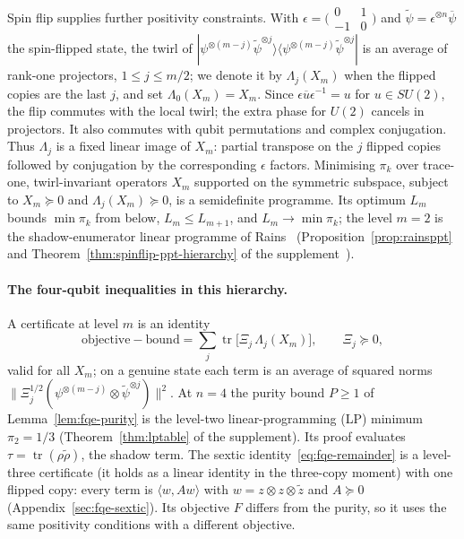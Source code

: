 Spin flip supplies further positivity constraints. With
$\epsilon=\bigl(\begin{smallmatrix}0&1\\-1&0\end{smallmatrix}\bigr)$ and
$\tilde\psi=\epsilon^{\otimes n}\overline\psi$ the spin-flipped state, the twirl of
$|\psi^{\otimes(m-j)}\tilde\psi^{\otimes j}\rangle\langle\psi^{\otimes(m-j)}\tilde\psi^{\otimes j}|$ is an average of
rank-one projectors, $1\le j\le m/2$; we denote it by $\Lambda_j(X_m)$ when the flipped copies are the last $j$, and set
$\Lambda_0(X_m)=X_m$. Since $\epsilon\overline u\epsilon^{-1}=u$ for $u\in SU(2)$, the flip commutes with the
local twirl; the extra phase for $U(2)$ cancels in projectors. It also commutes with qubit
permutations and complex conjugation. Thus $\Lambda_j$ is a fixed linear image of $X_m$: partial
transpose on the $j$ flipped copies followed by conjugation by the corresponding $\epsilon$ factors.
Minimising $\pi_k$ over trace-one, twirl-invariant operators $X_m$ supported on the symmetric subspace,
subject to $X_m\succeq0$ and $\Lambda_j(X_m)\succeq0$, is a semidefinite programme. Its optimum $L_m$ bounds $\min\pi_k$ from below, $L_m\le L_{m+1}$, and $L_m\to\min\pi_k$; the
level $m=2$ is the shadow-enumerator linear programme of Rains~\cite{Rains}
(Proposition~\ref{prop:rainsppt} and Theorem~\ref{thm:spinflip-ppt-hierarchy} of the supplement~\cite{Companion}).

\paragraph{The four-qubit inequalities in this hierarchy.} A certificate at level $m$ is an identity
\[
 \text{objective}-\text{bound}=\sum_{j}\operatorname{tr}\bigl[\Xi_j\,\Lambda_j(X_m)\bigr],\qquad \Xi_j\succeq0,
\]
valid for all $X_m$; on a genuine state each term is an average of squared norms
$\|\Xi_j^{1/2}(\psi^{\otimes(m-j)}\otimes\tilde\psi^{\otimes j})\|^2$.
At $n=4$ the purity bound $P\ge1$ of Lemma~\ref{lem:fqe-purity} is the level-two linear-programming (LP) minimum
$\pi_2=1/3$ (Theorem~\ref{thm:lptable} of the supplement). Its proof evaluates $\tau=\operatorname{tr}(\rho\tilde\rho)$, the
shadow term. The sextic identity~\eqref{eq:fqe-remainder} is a level-three certificate (it holds as a linear identity in the three-copy moment) with one flipped copy: every
term is $\langle w,Aw\rangle$ with $w=z\otimes z\otimes\tilde z$ and $A\succeq0$
(Appendix~\ref{sec:fqe-sextic}). Its objective $F$ differs from the purity, so it uses the same positivity
conditions with a different objective.

